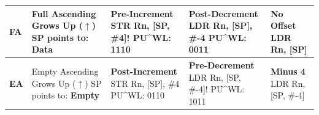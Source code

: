 \documentclass[../comorg-part1.tex]{subfiles}
\begin{document}
\begin{landscape}
\begin{center}
\begin{minipage}{\linewidth}
\begin{tabular}{|l|>{\centering\arraybackslash}p{3.5cm}|>{\centering\arraybackslash}p{4cm}|>{\centering\arraybackslash}p{4cm}|>{\centering\arraybackslash}p{3.5cm}|}
        \textbf{FA} & 
        Full Ascending \newline Grows Up ($\uparrow$) \newline SP points to: \textbf{Data} & 
        \textbf{Pre-Increment} \newline \ttfamily STR Rn, [SP, \#4]! \newline PU\^{}WL: 1110 & 
        \textbf{Post-Decrement} \newline \ttfamily LDR Rn, [SP], \#-4 \newline PU\^{}WL: 0011 &
        \textbf{No Offset} \newline \ttfamily LDR Rn, [SP] \\ 
        \hline

        \textbf{EA} & 
        Empty Ascending \newline Grows Up ($\uparrow$) \newline SP points to: \textbf{Empty} & 
        \textbf{Post-Increment} \newline \ttfamily STR Rn, [SP], \#4 \newline PU\^{}WL: 0110 & 
        \textbf{Pre-Decrement} \newline \ttfamily LDR Rn, [SP, \#-4]! \newline PU\^{}WL: 1011 &
        \textbf{Minus 4} \newline \ttfamily LDR Rn, [SP, \#-4] \\ 
        \hline
        \end{tabular}
        
        \vspace{15pt}
    \end{minipage}
\end{center}


\end{landscape}
\end{document}
